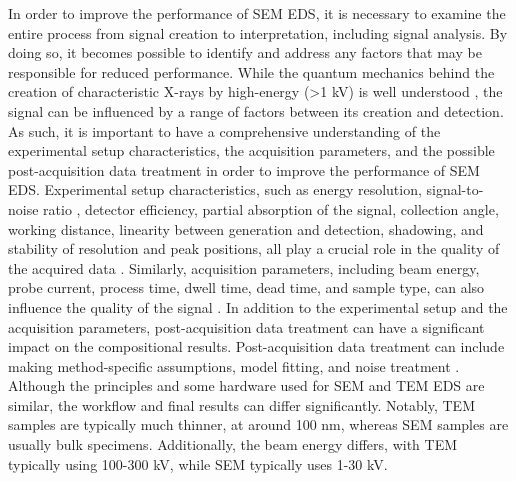 


In order to improve the performance of SEM EDS, it is necessary to examine the entire process from signal creation to interpretation, including signal analysis.
By doing so, it becomes possible to identify and address any factors that may be responsible for reduced performance.
While the quantum mechanics behind the creation of characteristic X-rays by high-energy (>1 kV) is well understood \cite{hollas_modern_2004,goldstein_scanning_2018}, the signal can be influenced by a range of factors between its creation and detection.
As such, it is important to have a comprehensive understanding of the experimental setup characteristics, the acquisition parameters, and the possible post-acquisition data treatment in order to improve the performance of SEM EDS.
Experimental setup characteristics, such as energy resolution, signal-to-noise ratio \cite{fiori_peak_background_1982}, detector efficiency, partial absorption of the signal, collection angle, working distance, linearity between generation and detection, shadowing, and stability of resolution and peak positions, all play a crucial role in the quality of the acquired data \cite{goldstein_scanning_2018} .
Similarly, acquisition parameters, including beam energy, probe current, process time, dwell time, dead time, and sample type, can also influence the quality of the signal \cite{goldstein_scanning_2018}.
In addition to the experimental setup and the acquisition parameters, post-acquisition data treatment can have a significant impact on the compositional results.
Post-acquisition data treatment can include making method-specific assumptions, model fitting, and noise treatment .
Although the principles and some hardware used for SEM and TEM EDS are similar, the workflow and final results can differ significantly.
Notably, TEM samples are typically much thinner, at around 100 nm, whereas SEM samples are usually bulk specimens.
Additionally, the beam energy differs, with TEM typically using 100-300 kV, while SEM typically uses 1-30 kV.

